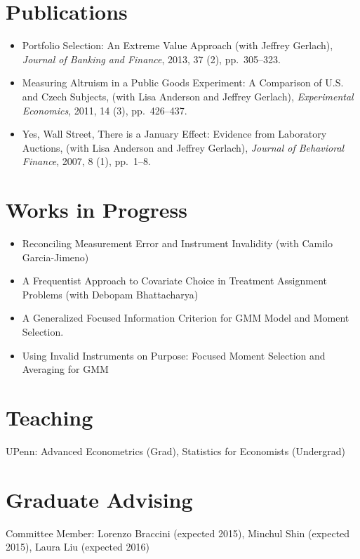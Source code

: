 \documentclass[11pt,line,overlapped,letterpaper]{myres}
\begin{document}
\begin{resume}

\section{\sc Publications}
\begin{itemize}
	\item Portfolio Selection: An Extreme Value Approach (with Jeffrey Gerlach), \emph{Journal of Banking and Finance}, 2013, 37 (2), pp.\ 305--323.
	\item Measuring Altruism in a Public Goods Experiment:  A Comparison of U.S. and Czech Subjects, (with Lisa Anderson and Jeffrey Gerlach), \emph{Experimental Economics}, 2011, 14 (3), pp.\ 426--437.
	\item Yes, Wall Street, There is a January Effect: Evidence from Laboratory Auctions, (with Lisa Anderson and Jeffrey Gerlach), \emph{Journal of Behavioral Finance}, 2007, 8 (1), pp.\ 1--8. 
\end{itemize}






\section{\sc Works in Progress}
\begin{itemize}
	\item Reconciling Measurement Error and Instrument Invalidity (with Camilo Garcia-Jimeno)
	\item A Frequentist Approach to Covariate Choice in Treatment Assignment Problems (with Debopam Bhattacharya)
	\item A Generalized Focused Information Criterion for GMM Model and Moment Selection.
	\item Using Invalid Instruments on Purpose: Focused Moment Selection and Averaging for GMM

\end{itemize}




\section{\sc Teaching }
\vspace{0.5em}
	UPenn: Advanced Econometrics (Grad), Statistics for Economists (Undergrad)
	


\section{\sc Graduate Advising}
\vspace{0.5em}
Committee Member: Lorenzo Braccini (expected 2015), Minchul Shin (expected 2015), Laura Liu (expected 2016)



\end{resume}
\end{document}
